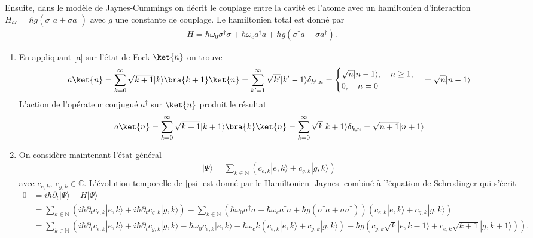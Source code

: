 {Ensuite, dans le modèle de Jaynes-Cummings on décrit le couplage entre la cavité et l'atome avec un hamiltonien d'interaction $H_{ac} = \hbar g (\sigma^\dagger a + \sigma a^\dagger)$ avec $g$ une constante de couplage. Le hamiltonien total est donné par 
\begin{align}
    H = \hbar \omega_0\sigma^\dagger \sigma + \hbar \omega_c a^\dagger a + \hbar g (\sigma^\dagger a + \sigma a^\dagger). \label{Jaynes}
\end{align}
\begin{enumerate}
    \item En appliquant \eqref{a} sur l'état de Fock $\ket{n}$ on trouve
    \begin{align}
      a \ket{n} = \sum_{k=0}^{\infty} \sqrt{k+1}|k\rangle\bra{k+1}\ket{n} = \sum_{k'=1}^{\infty} \sqrt{k'}|k'-1\rangle \delta_{k', n} = \begin{cases}
         \sqrt{n}|n-1\rangle, \quad n\ge 1,\\ 
         0, \quad n = 0
      \end{cases} 
      = \sqrt{n}|n-1\rangle \label{aa}
    \end{align}
    L'action de l'opérateur conjugué $a^\dagger$ sur $\ket{n}$ produit le résultat 
    \begin{align}
        a \ket{n} = \sum_{k=0}^{\infty} \sqrt{k+1}|k+1\rangle\bra{k}\ket{n} = \sum_{k=0}^{\infty} \sqrt{k}|k+1\rangle \delta_{k, n} =
           \sqrt{n+1}|n+1\rangle \label{aad}
    \end{align}
    \item On considère maintenant l'état général
    \begin{align}
        |\Psi\rangle=\sum_{k\in \mathbb{N}} (c_{e, k}|e, k\rangle+c_{g, k}|g, k\rangle) \label{psi}
    \end{align}
    avec $c_{e, k}, \ c_{g, k} \in \mathbb{C}$. L'évolution temporelle de \eqref{psi} est donné par le Hamiltonien \eqref{Jaynes} combiné à l'équation de Schrodinger qui s'écrit 
    \begin{align}
       0 &=  i \hbar \partial_t |\Psi\rangle - H |\Psi\rangle \nonumber\\
       &= \sum_{k\in \mathbb{N}} (i\hbar\partial_t{c}_{e, k}|e, k\rangle+i\hbar\partial_t{c}_{g, k}|g, k\rangle) - \sum_{k\in \mathbb{N}} \left(\hbar \omega_0\sigma^\dagger \sigma + \hbar \omega_c a^\dagger a + \hbar g  (\sigma^\dagger a + \sigma a^\dagger) \right)(c_{e, k}|e, k\rangle+c_{g, k}|g, k\rangle) \nonumber\\
       &=  \sum_{k\in \mathbb{N}} \left(i\hbar\partial_t{c}_{e, k}|e, k\rangle+i\hbar\partial_t{c}_{g, k}|g, k\rangle - \hbar \omega_0 c_{e, k}|e, k\rangle - \hbar \omega_c k (c_{e, k}|e, k\rangle+c_{g, k}|g, k\rangle)  - \hbar g  (c_{g, k}\sqrt{k}|e, k-1\rangle +  c_{e, k}\sqrt{k+1}|g, k+1\rangle) \right).\label{psi2}

\end{align}
\end{enumerate}}
